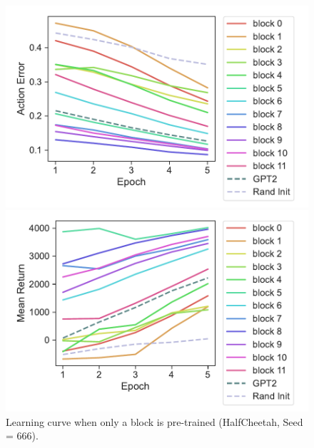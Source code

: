 \documentclass{article}
\begin{document}
\begin{figure}[H]
    \centering
    \begin{minipage}[b]{0.48\linewidth}
        \includegraphics[width=\linewidth]{figs/actionerror_block_gpt2_dt_K1_halfcheetah_medium_666.pdf}
    \end{minipage}
    \begin{minipage}[b]{0.48\linewidth}
        \includegraphics[width=\linewidth]{figs/returnmean_block_gpt2_dt_K1_halfcheetah_medium_666.pdf}
    \end{minipage}
    \caption{Learning curve when only a block is pre-trained (HalfCheetah, Seed = 666).}
    \label{fig:learning_curve_halfcheetah}
\end{figure}
\end{document}
